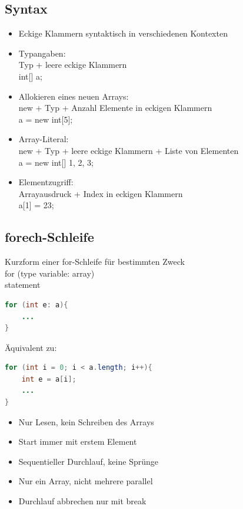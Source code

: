 \subsection{Syntax}
\begin{itemize}
\item Eckige Klammern syntaktisch in verschiedenen Kontexten
\item Typangaben:\\
Typ + leere eckige Klammern\\
int[] a;
\item Allokieren eines neuen Arrays:\\
new + Typ + Anzahl Elemente in eckigen Klammern\\
a = new int[5];
\item Array-Literal:\\
new + Typ + leere eckige Klammern + Liste von Elementen\\
a = new int[] {1, 2, 3};
\item Elementzugriff:\\
Arrayausdruck + Index in eckigen Klammern\\
a[1] = 23;
\end{itemize}

\subsection{forech-Schleife}
Kurzform einer for-Schleife für bestimmten Zweck\\
for (type variable: array)\\
statement\\
 \begin{lstlisting}[language=JAVA]
 for (int e: a){
 	...
}
\end{lstlisting}
Äquivalent zu:
 \begin{lstlisting}[language=JAVA]
for (int i = 0; i < a.length; i++){
	int e = a[i];
	...
}

\end{lstlisting}
\begin{itemize}
\item Nur Lesen, kein Schreiben des Arrays
\item Start immer mit erstem Element
\item Sequentieller Durchlauf, keine Sprünge
\item Nur ein Array, nicht mehrere parallel
\item Durchlauf abbrechen nur mit break
\end{itemize}
